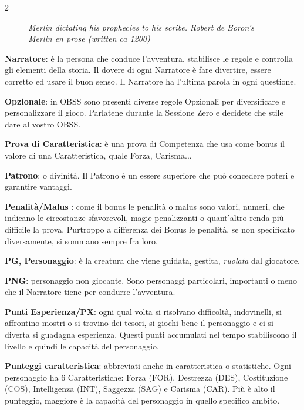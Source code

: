 \begin{multicols}{2}
\begin{figure}
\emph{Merlin dictating his prophecies to his scribe. Robert de Boron's Merlin en prose (written ca 1200)}
\end{figure}

%

\textbf{Narratore}: è la persona che conduce l'avventura, stabilisce le regole e controlla gli elementi della storia. Il dovere di ogni Narratore è fare divertire, essere corretto ed usare il buon senso. Il Narratore ha l'ultima parola in ogni questione.

\textbf{Opzionale}: in OBSS sono presenti diverse regole Opzionali per diversificare e personalizzare il gioco. Parlatene durante la Sessione Zero e decidete che stile dare al vostro OBSS.

\textbf{Prova di Caratteristica}: è una prova di Competenza che usa come bonus il valore di una Caratteristica, quale Forza, Carisma...

\textbf{Patrono}: o divinità. Il Patrono è un essere superiore che può concedere poteri e garantire vantaggi.

\textbf{Penalità/Malus} : come il bonus le penalità o malus sono valori, numeri, che indicano le circostanze sfavorevoli, magie penalizzanti o quant'altro renda più difficile la prova. Purtroppo a differenza dei Bonus le penalità, se non specificato diversamente, si sommano sempre fra loro.

\textbf{PG, Personaggio}: è la creatura che viene guidata, gestita, \emph{ruolata} dal giocatore.

\textbf{PNG}: personaggio non giocante. Sono personaggi particolari, importanti o meno che il Narratore tiene per condurre l'avventura.

\textbf{Punti Esperienza/PX}:   ogni qual volta si risolvano difficoltà, indovinelli, si affrontino mostri o si trovino dei tesori, si giochi bene il personaggio e ci si diverta si guadagna esperienza. Questi punti accumulati nel tempo stabiliscono il livello e quindi le capacità del personaggio.

\textbf{Punteggi caratteristica}:   abbreviati anche in caratteristica o statistiche. Ogni personaggio ha 6 Caratteristiche: Forza (FOR), Destrezza (DES), Costituzione (COS), Intelligenza (INT), Saggezza (SAG) e Carisma (CAR). Più è alto il punteggio, maggiore è la capacità del personaggio in quello specifico ambito.


\end{multicols}
